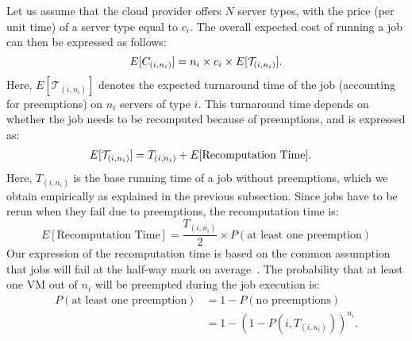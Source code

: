 

Let us assume that the cloud provider offers $N$ server types, with the price (per unit time) of a server type equal to $c_i$. 
The overall expected cost of running a job can then be expressed as follows:
\begin{equation}
  \label{eq:e-cost}
\vspace*{\eqnspace}
  E[C_{( i,n_i )}] = n_i\times c_i \times E[\mathcal{T}_{( i,n_i )}].
\end{equation}
Here, $E[\mathcal{T}_{( i,n_i )}]$ denotes the expected turnaround time of the job (accounting for preemptions) on $n_i$ servers of type $i$.
%
This turnaround time depends on whether the job needs to be recomputed because of preemptions, and is expressed as:
\begin{align}
  \label{eq:turnaround}
  \vspace*{\eqnspace}
  E[\mathcal{T}_{( i,n_i )}] &= T_{( i,n_i )} + E[\text{Recomputation Time}].
\end{align}
Here, $T_{( i,n_i )}$ is the base running time of a job without preemptions, which we obtain empirically as explained in the previous subsection.
Since jobs have to be rerun when they fail due to preemptions, the recomputation time is:
\begin{equation}
  \label{eq:recomput}
   E[\text{Recomputation Time}] = \frac{T_{( i,n_i )}}{2} \times P(\text{at least one preemption})
 \end{equation}
 Our expression of the recomputation time is based on the common assumption that jobs will fail at the half-way mark on average~\cite{daly2006higher, bougeret_checkpointing_2011}. 
%
 The probability that at least one VM out of $n_i$ will be preempted during the job execution is:
\begin{align}
  \label{eq:pfail1}
  P(\text{at least one preemption}) &= 1-P(\text{no preemptions}) \\
                                 &= 1-\left(1-P\left(i,T_{(i, n_i)}\right)\right)^{n_i}.
\end{align}

